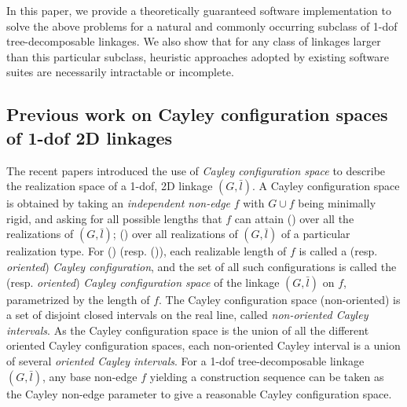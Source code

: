 \documentclass[prodmode,acmtoms]{acmsmall}
\begin{document}
In this paper, we provide a theoretically guaranteed  software implementation to solve the above problems for 
 a natural and commonly occurring subclass of 1-dof tree-decomposable linkages. %
We also show that for any class of linkages larger than  this particular subclass, %
heuristic approaches adopted by existing software suites are necessarily intractable or incomplete. 


\subsection{Previous work on Cayley configuration spaces of 1-dof 2D linkages}
\label{sec:previous_cayley}


The recent papers 
introduced the use of \emph{Cayley configuration space} to describe the 
realization space of a 1-dof, 2D linkage $(G,\bar{l})$.  
A Cayley configuration space is obtained by taking %
an {\em independent non-edge} $f$ with $G\cup f$ being minimally rigid, 
and asking for all possible lengths that $f$ can attain %
() over all the realizations of $(G, \bar{l})$; 
() over all realizations of $(G, \bar{l})$ of a particular realization type. %
For () (resp. ()), each realizable length of $f$ is called a (resp. \emph{oriented}) \emph{Cayley configuration}, 
and the set of all such configurations is called the (resp. \emph{oriented}) \emph{Cayley configuration space} of the linkage $(G,\bar{l})$ on $f$, parametrized by the length of $f$. 
The Cayley configuration space (non-oriented) is a set of disjoint closed intervals on the real line, 
called \emph{non-oriented Cayley intervals}.
As the Cayley configuration space is the union of all the different oriented Cayley configuration spaces, 
each non-oriented Cayley interval is a union of several \emph{oriented Cayley intervals}. 
For a 1-dof tree-decomposable linkage $(G, \bar{l})$, 
any base non-edge $f$ yielding a construction sequence can be taken as the Cayley non-edge parameter to give a reasonable Cayley configuration space. 
\end{document}
